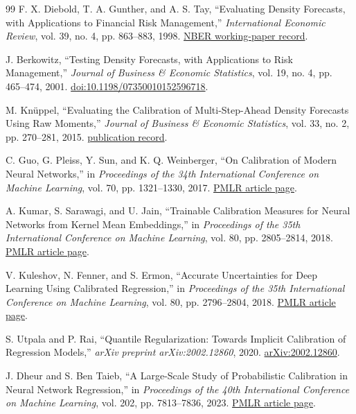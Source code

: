 \documentclass[11pt]{article}
\begin{document}
\begin{thebibliography}{99}
F. X. Diebold, T. A. Gunther, and A. S. Tay,
``Evaluating Density Forecasts, with Applications to Financial Risk
Management,'' \emph{International Economic Review}, vol. 39, no. 4,
pp. 863--883, 1998.
\href{https://www.nber.org/papers/t0215}{NBER working-paper record}.

J. Berkowitz,
``Testing Density Forecasts, with Applications to Risk Management,''
\emph{Journal of Business \& Economic Statistics}, vol. 19, no. 4,
pp. 465--474, 2001.
\href{https://doi.org/10.1198/07350010152596718}{doi:10.1198/07350010152596718}.

M. Kn\"uppel,
``Evaluating the Calibration of Multi-Step-Ahead Density Forecasts Using Raw
Moments,'' \emph{Journal of Business \& Economic Statistics}, vol. 33,
no. 2, pp. 270--281, 2015.
\href{https://ideas.repec.org/a/taf/jnlbes/v33y2015i2p270-281.html}{publication record}.

C. Guo, G. Pleiss, Y. Sun, and K. Q. Weinberger,
``On Calibration of Modern Neural Networks,'' in
\emph{Proceedings of the 34th International Conference on Machine Learning},
vol. 70, pp. 1321--1330, 2017.
\href{https://proceedings.mlr.press/v70/guo17a.html}{PMLR article page}.

A. Kumar, S. Sarawagi, and U. Jain,
``Trainable Calibration Measures for Neural Networks from Kernel Mean
Embeddings,'' in \emph{Proceedings of the 35th International Conference on
Machine Learning}, vol. 80, pp. 2805--2814, 2018.
\href{https://proceedings.mlr.press/v80/kumar18a.html}{PMLR article page}.

V. Kuleshov, N. Fenner, and S. Ermon,
``Accurate Uncertainties for Deep Learning Using Calibrated Regression,'' in
\emph{Proceedings of the 35th International Conference on Machine Learning},
vol. 80, pp. 2796--2804, 2018.
\href{https://proceedings.mlr.press/v80/kuleshov18a.html}{PMLR article page}.

S. Utpala and P. Rai,
``Quantile Regularization: Towards Implicit Calibration of Regression Models,''
\emph{arXiv preprint arXiv:2002.12860}, 2020.
\href{https://arxiv.org/abs/2002.12860}{arXiv:2002.12860}.

J. Dheur and S. Ben Taieb,
``A Large-Scale Study of Probabilistic Calibration in Neural Network Regression,''
in \emph{Proceedings of the 40th International Conference on Machine Learning},
vol. 202, pp. 7813--7836, 2023.
\href{https://proceedings.mlr.press/v202/dheur23a.html}{PMLR article page}.


\end{thebibliography}
\end{document}
